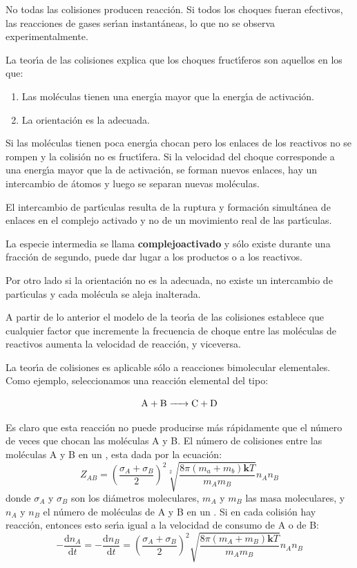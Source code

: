 No todas las colisiones producen reacci\'on. Si todos los choques fueran efectivos, las reacciones de gases ser\'{\i}an instant\'aneas, lo que no se observa experimentalmente.

La teor\'{\i}a de las colisiones explica que los choques  fruct\'{\i}feros son aquellos en los que:
\begin{enumerate}
\item Las mol\'eculas tienen una energ\'{\i}a mayor que la
energ\'{\i}a de activaci\'on.
\item La orientaci\'on es la adecuada.
\end{enumerate}
Si las mol\'eculas tienen poca energ\'{\i}a chocan pero los enlaces de los reactivos no se rompen y la colisi\'on no es fruct\'{\i}fera. Si la velocidad del choque corresponde a una energ\'{\i}a mayor que la de activaci\'on, se forman nuevos enlaces, hay un intercambio de \'atomos y luego se separan nuevas mol\'e\-culas.

El intercambio de part\'{\i}culas resulta de la ruptura y formaci\'on simult\'a\-nea de enlaces en el complejo
activado y no de un movimiento real de las part\'{\i}culas.

La especie intermedia se llama \textbf{\gls{complejoactivado}}
y s\'olo existe durante una fracci\'on de segundo, puede dar
lugar a los productos o a los reactivos.

Por otro lado si la orientaci\'on no es la adecuada, no existe un intercambio de part\'{\i}culas y cada mol\'ecula se aleja inalterada.

A partir de lo anterior el modelo de la teor\'{\i}a de las colisiones establece que cualquier factor que incremente la frecuencia de choque entre las mo\-l\'e\-culas de reactivos aumenta la velocidad de reacci\'on, y viceversa.

La teor\'{\i}a de colisiones es aplicable s\'olo a reacciones bimolecular elementales. Como ejemplo, seleccionamos una reacci\'on elemental del tipo:

$$\ce{A + B -> C + D}$$

Es claro que esta reacci\'on no puede producirse m\'as r\'apidamente que el n\'umero de veces que chocan las mol\'eculas A y B. El n\'umero de colisiones entre las mol\'eculas A y B en un \centi\square\metre\per\second, esta dada por la ecuaci\'on:
\begin{equation}
 Z_{AB}= \left( \frac{ \sigma_A+ \sigma_B }{2}\right)^2 \sqrt[2]{\frac{8 \pi(m_a+m_b)\textbf{k}T }{m_Am_B}} n_An_B 
\end{equation}
donde $\sigma_A$ y $\sigma_B$  son los di\'ametros moleculares, $m_A$ y $m_B$ las masa moleculares, y $n_A$ y $n_B$ el n\'umero de mol\'eculas de A y B en un \centi\cubic\metre. Si en cada colisi\'on hay reacci\'on, entonces esto ser\'{\i}a igual a la velocidad de consumo de A o de B:
\begin{equation}
 -\frac{\mathrm{d}n_A}{\mathrm{d}t}=-\frac{\mathrm{d}n_B}{\mathrm{d}t}=\left(\frac{ \sigma_A+ \sigma_B }{ 2 }\right)^2 \sqrt{\frac{8 \pi(m_A+m_B)\textbf{k}T }{m_Am_B}}n_An_B 
\end{equation}


